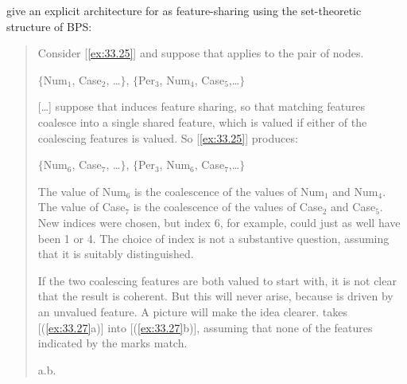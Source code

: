 \documentclass[output=paper]{langsci/langscibook}
\begin{document}
\citet{frampton2000agreement} give an explicit architecture for  as
feature-sharing using the set-theoretic structure of \gls{BPS}:

\blockquote[{\citealt{frampton2000agreement}}]{Consider [\eqref{ex:33.25}]
    and suppose that  applies to the pair of nodes.

{\small
\ea\label{ex:33.25}$\{$Num${}_1$, Case${}_2$, \ldots$\}$,
$\{$Per${}_3$, Num${}_4$, Case${}_5$,\dots$\}$
\z}

[\ldots] suppose that  induces feature sharing, so that matching features
coalesce into a single shared feature, which is valued if either of the
coalescing features is valued. So [\eqref{ex:33.25}] produces:

{\small
\ea\label{ex:33.26}$\{$Num${}_6$, Case${}_7$, \ldots$\}$,
$\{$Per${}_3$, Num${}_6$, Case${}_7$,\dots$\}$
\z}

The value of Num$_6$ is the coalescence of the values of Num$_1$ and Num$_4$.
The value of Case$_7$ is the coalescence of the values of Case$_2$ and
Case$_5$. New indices were chosen, but index 6, for example, could just as well
have been 1 or 4. The choice of index is not a substantive question, assuming
that it is suitably distinguished.

If the two coalescing features are both valued to start with, it is not clear
that the result is coherent. But this will never arise, because  is driven
by an unvalued feature. A picture will make the idea clearer.  takes
[(\ref{ex:33.27}a)] into [(\ref{ex:33.27}b)], assuming that none of the
features indicated by the  marks match.

\ea\label{ex:33.27} a.\hspace{6.25cm}b.
    }
\end{document}
